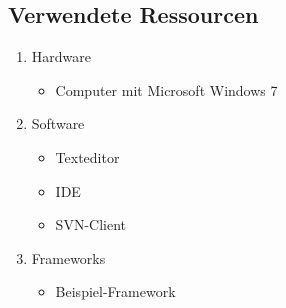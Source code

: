 \subsection{Verwendete Ressourcen}
\label{app:Ressourcen}
\begin{enumerate}
\item Hardware
	\begin{itemize}
	\item Computer mit Microsoft Windows 7
	\end{itemize}
\item Software
	\begin{itemize}
	\item Texteditor
	\item IDE
	\item \acs{SVN}-Client
	\end{itemize}
\item Frameworks
	\begin{itemize}
	\item Beispiel-Framework
	\end{itemize}
\end{enumerate}

